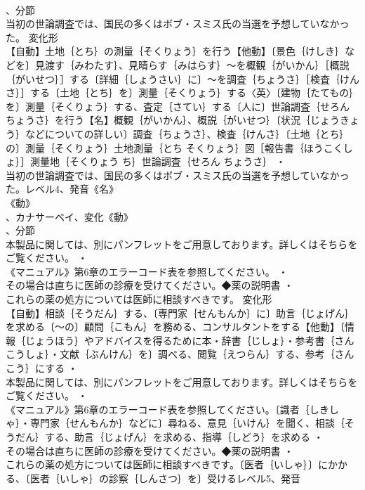 \documentclass[8pt]{extreport}
\begin{document}
\begin{CJK}{UTF8}{min}
\\	、分節
\\	当初の世論調査では、国民の多くはボブ・スミス氏の当選を予想していなかった。	変化形 
\\	【自動】土地｛とち｝の測量｛そくりょう｝を行う【他動】〔景色｛けしき｝などを〕見渡す｛みわたす｝、見晴らす｛みはらす｝～を概観｛がいかん｝［概説｛がいせつ｝］する〔詳細｛しょうさい｝に〕～を調査｛ちょうさ｝［検査｛けんさ｝］する〔土地｛とち｝を〕測量｛そくりょう｝する〈英〉〔建物｛たてもの｝を〕測量｛そくりょう｝する、査定｛さてい｝する〔人に〕世論調査｛せろん ちょうさ｝を行う【名】概観｛がいかん｝、概説｛がいせつ｝〔状況｛じょうきょう｝などについての詳しい〕調査｛ちょうさ｝、検査｛けんさ｝〔土地｛とち｝の〕測量｛そくりょう｝土地測量｛とち そくりょう｝図［報告書｛ほうこくしょ｝］測量地｛そくりょう ち｝世論調査｛せろん ちょうさ｝ ・
\\	当初の世論調査では、国民の多くはボブ・スミス氏の当選を予想していなかった。レベル4、発音《名》
\\	《動》
\\	、カナサーベイ、変化《動》
\\	、分節
\\	本製品に関しては、別にパンフレットをご用意しております。詳しくはそちらをご覧ください。 ・
\\	《マニュアル》第6章のエラーコード表を参照してください。 ・
\\	その場合は直ちに医師の診療を受けてください。◆薬の説明書 ・
\\	これらの薬の処方については医師に相談すべきです。	変化形 
\\	【自動】相談｛そうだん｝する、〔専門家｛せんもんか｝に〕助言｛じょげん｝を求める〔～の〕顧問｛こもん｝を務める、コンサルタントをする【他動】〔情報｛じょうほう｝やアドバイスを得るために本・辞書｛じしょ｝・参考書｛さんこうしょ｝・文献｛ぶんけん｝を〕調べる、閲覧｛えつらん｝する、参考｛さんこう｝にする ・
\\	本製品に関しては、別にパンフレットをご用意しております。詳しくはそちらをご覧ください。 ・
\\	《マニュアル》第6章のエラーコード表を参照してください。〔識者｛しきしゃ｝・専門家｛せんもんか｝などに〕尋ねる、意見｛いけん｝を聞く、相談｛そうだん｝する、助言｛じょげん｝を求める、指導｛しどう｝を求める ・
\\	その場合は直ちに医師の診療を受けてください。◆薬の説明書 ・
\\	これらの薬の処方については医師に相談すべきです。〔医者｛いしゃ｝〕にかかる、〔医者｛いしゃ｝の診察｛しんさつ｝を〕受けるレベル5、発音

\end{CJK}
\end{document}
